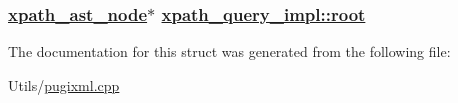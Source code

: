 \hypertarget{structxpath__query__impl_d25499e0c8391005e3a1a60633d631fe}{
\subsubsection[root]{\setlength{\rightskip}{0pt plus 5cm}\hyperlink{classxpath__ast__node}{xpath\_\-ast\_\-node}$\ast$ \hyperlink{structxpath__query__impl_d25499e0c8391005e3a1a60633d631fe}{xpath\_\-query\_\-impl::root}}}
\label{structxpath__query__impl_d25499e0c8391005e3a1a60633d631fe}




The documentation for this struct was generated from the following file:\begin{CompactItemize}
\item 
Utils/\hyperlink{pugixml_8cpp}{pugixml.cpp}\end{CompactItemize}
